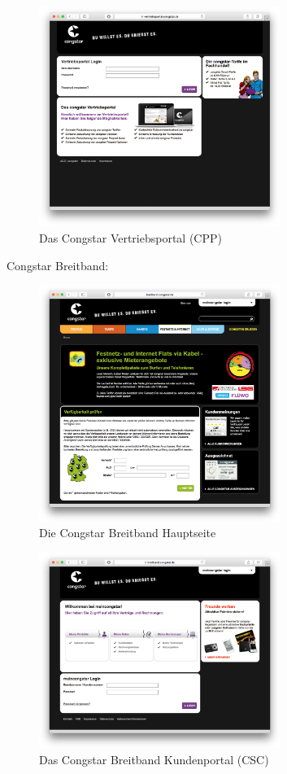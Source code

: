 \documentclass[11pt,a4paper]{article} %
\begin{document}
\begin{figure}[H]
\includegraphics[width=0.7\textwidth]{images/Sites/Congstar_CPP.png}
\centering
\caption{Das Congstar Vertriebsportal (CPP) \cite{ccpp}}
\end{figure}

\pagebreak
Congstar Breitband:

\begin{figure}[H]
\includegraphics[width=0.7\textwidth]{images/Sites/Congstar_Breitband.png}
\centering
\caption{Die Congstar Breitband Hauptseite \cite{cb}}
\label{figure1}
\end{figure}

\begin{figure}[H]
\includegraphics[width=0.7\textwidth]{images/Sites/Congstar_Breitband_CSC.png}
\centering
\caption{Das Congstar Breitband Kundenportal (CSC) \cite{cbcsc}}
\end{figure}
\end{document}
